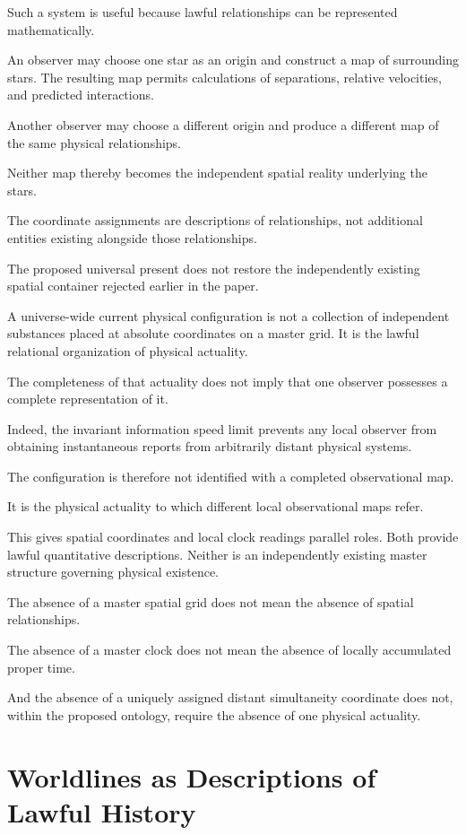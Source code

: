 \documentclass[12pt,onecolumn]{article}
\begin{document}
Such a system is useful because lawful relationships can be represented mathematically.

An observer may choose one star as an origin and construct a map of surrounding stars. The resulting map permits calculations of separations, relative velocities, and predicted interactions.

Another observer may choose a different origin and produce a different map of the same physical relationships.

Neither map thereby becomes the independent spatial reality underlying the stars.

The coordinate assignments are descriptions of relationships, not additional entities existing alongside those relationships.

The proposed universal present does not restore the independently existing spatial container rejected earlier in the paper.

A universe-wide current physical configuration is not a collection of independent substances placed at absolute coordinates on a master grid. It is the lawful relational organization of physical actuality.

The completeness of that actuality does not imply that one observer possesses a complete representation of it.

Indeed, the invariant information speed limit prevents any local observer from obtaining instantaneous reports from arbitrarily distant physical systems.

The configuration is therefore not identified with a completed observational map.

It is the physical actuality to which different local observational maps refer.

This gives spatial coordinates and local clock readings parallel roles. Both provide lawful quantitative descriptions. Neither is an independently existing master structure governing physical existence.

The absence of a master spatial grid does not mean the absence of spatial relationships.

The absence of a master clock does not mean the absence of locally accumulated proper time.

And the absence of a uniquely assigned distant simultaneity coordinate does not, within the proposed ontology, require the absence of one physical actuality.

\section{Worldlines as Descriptions of Lawful History}
\end{document}
